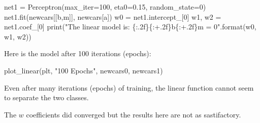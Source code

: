 \documentclass[
  letterpaper,
]{scrbook}
\newenvironment{Shaded}{\begin{snugshade}}{\end{snugshade}}
\newcommand{\BuiltInTok}[1]{\textcolor[rgb]{0.00,0.23,0.31}{#1}}
\newcommand{\DecValTok}[1]{\textcolor[rgb]{0.68,0.00,0.00}{#1}}
\newcommand{\FloatTok}[1]{\textcolor[rgb]{0.68,0.00,0.00}{#1}}
\newcommand{\NormalTok}[1]{\textcolor[rgb]{0.00,0.23,0.31}{#1}}
\newcommand{\OperatorTok}[1]{\textcolor[rgb]{0.37,0.37,0.37}{#1}}
\newcommand{\SpecialCharTok}[1]{\textcolor[rgb]{0.37,0.37,0.37}{#1}}
\newcommand{\StringTok}[1]{\textcolor[rgb]{0.13,0.47,0.30}{#1}}
\begin{document}
\begin{Shaded}
\begin{Highlighting}[]
\NormalTok{net1 }\OperatorTok{=}\NormalTok{ Perceptron(max\_iter}\OperatorTok{=}\DecValTok{100}\NormalTok{, eta0}\OperatorTok{=}\FloatTok{0.15}\NormalTok{, random\_state}\OperatorTok{=}\DecValTok{0}\NormalTok{)}
\NormalTok{net1.fit(newcars[[}\StringTok{\textquotesingle{}b\textquotesingle{}}\NormalTok{,}\StringTok{\textquotesingle{}m\textquotesingle{}}\NormalTok{]], newcars[}\StringTok{\textquotesingle{}a\textquotesingle{}}\NormalTok{])}
\NormalTok{w0 }\OperatorTok{=}\NormalTok{ net1.intercept\_[}\DecValTok{0}\NormalTok{]}
\NormalTok{w1, w2 }\OperatorTok{=}\NormalTok{ net1.coef\_[}\DecValTok{0}\NormalTok{]}
\BuiltInTok{print}\NormalTok{(}\StringTok{"The linear model is: }\SpecialCharTok{\{:.2f\}\{:+.2f\}}\StringTok{b}\SpecialCharTok{\{:+.2f\}}\StringTok{m = 0"}\NormalTok{.}\BuiltInTok{format}\NormalTok{(w0, w1, w2))}
\end{Highlighting}
\end{Shaded}

Here is the model after 100 iterations (epochs):

\begin{Shaded}
\begin{Highlighting}[]
\NormalTok{plot\_linear(plt, }\StringTok{"100 Epochs"}\NormalTok{, newcars0, newcars1)}
\end{Highlighting}
\end{Shaded}

Even after many iterations (epochs) of training, the linear function
cannot seem to separate the two classes.

The \(w\) coefficients did converged but the results here are not as
sastifactory.
\end{document}
